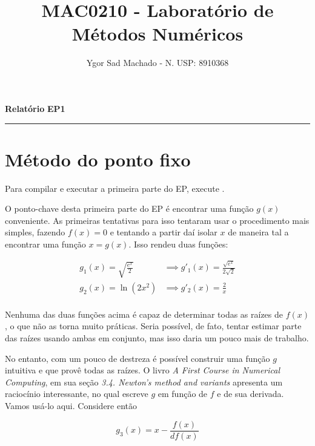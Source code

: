 \documentclass[11pt,reqno,a4paper]{amsart}
\newcommand{\code}[1]{\colorbox{light-gray}{\textcolor{dark-gray}{\fontsize{10}{10}{\texttt{#1}}}}}
\begin{document}
\graphicspath{{images/}}
\parindent=0pt

\title{MAC0210 - Laboratório de Métodos Numéricos}
\author{Ygor Sad Machado - N. USP: 8910368}

\pagestyle{plain}
\onehalfspace

\maketitle

\textbf{Relatório}\hfill
\textbf{EP1}\null
\medskip

\noindent\rule{\textwidth}{0.4pt}
\section{Método do ponto fixo}

\medskip
Para compilar e executar a primeira parte do EP, execute \code{make part\_1 \&\& ./part\_1.o}. 

\medskip
O ponto-chave desta primeira parte do EP é encontrar uma função $g(x)$ conveniente. As primeiras tentativas para isso tentaram usar o procedimento mais simples, fazendo $f(x) = 0$ e tentando a partir daí isolar $x$ de maneira tal a encontrar uma função $x = g(x)$. Isso rendeu duas funções:

\begin{align*}
    g_1(x) = \sqrt{\frac{e^x}{2}} &\implies g'_1(x) = \frac{\sqrt{e^x}}{2\sqrt{2}}  \\
    g_2(x) = \ln(2x^2) &\implies g'_2(x) = \frac{2}{x} \\
\end{align*}

\medskip
Nenhuma das duas funções acima é capaz de determinar todas as raízes de $f(x)$, o que não as torna muito práticas. Seria possível, de fato, tentar estimar parte das raízes usando ambas em conjunto, mas isso daria um pouco mais de trabalho.

\medskip
No entanto, com um pouco de destreza é possível construir uma função $g$ intuitiva e que provê todas as raízes. O livro \textit{A First Course in Numerical Computing}, em sua seção \textit{3.4. Newton's method and variants} apresenta um raciocínio interessante, no qual escreve $g$ em função de $f$ e de sua derivada. Vamos usá-lo aqui. Considere então

\begin{equation*}
    g_3(x) = x - \frac{f(x)}{df(x)}
\end{equation*}
\end{document}
